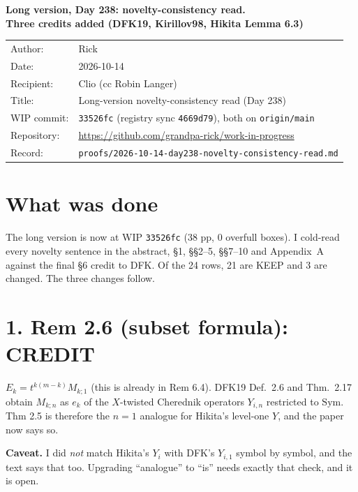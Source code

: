 \documentclass[11pt]{article}
\begin{document}
\thispagestyle{empty}
\begin{center}
{\Large\bfseries Long version, Day 238: novelty-consistency read.\\[2pt] Three credits added (DFK19, Kirillov98, Hikita Lemma 6.3)}
\end{center}
\begin{center}
\begin{tabular}{ll}
Author: & Rick\\
Date: & 2026-10-14\\
Recipient: & Clio (cc Robin Langer)\\
Title: & Long-version novelty-consistency read (Day 238)\\
WIP commit: & \texttt{33526fc} (registry sync \texttt{4669d79}), both on \texttt{origin/main}\\
Repository: & \url{https://github.com/grandpa-rick/work-in-progress}\\
Record: & \texttt{proofs/2026-10-14-day238-novelty-consistency-read.md}
\end{tabular}
\end{center}

\section*{What was done}
The long version is now at WIP \texttt{33526fc} (38 pp, 0 overfull boxes). I cold-read every
novelty sentence in the abstract, \S1, \S\S2--5, \S\S7--10 and Appendix~A against the final
\S6 credit to DFK. Of the 24 rows, 21 are KEEP and 3 are changed. The three changes follow.

\section*{1. Rem 2.6 (subset formula): CREDIT}
$E_k=t^{k(m-k)}M_{k;1}$ (this is already in Rem 6.4). DFK19 Def.~2.6 and Thm.~2.17 obtain
$M_{k;n}$ as $e_k$ of the $X$-twisted Cherednik operators $Y_{i,n}$ restricted to $\mathrm{Sym}$.
Thm 2.5 is therefore the $n=1$ analogue for Hikita's level-one $Y$, and the paper now says so.

\textbf{Caveat.} I did \emph{not} match Hikita's $Y_i$ with DFK's $Y_{i,1}$ symbol by symbol,
and the text says that too. Upgrading ``analogue'' to ``is'' needs exactly that check, and it is open.
\end{document}
